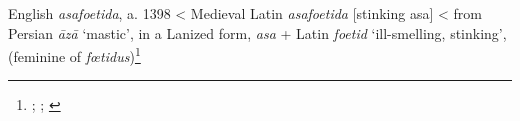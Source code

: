 \begin{etymology}\label{ety:asafoetida}
English \textit{asafoetida}, a. 1398
< Medieval Latin \textit{asafoetida} [stinking asa]
< from Persian \textit{āzā} `mastic', in a Lanized form, \textit{asa}
 + Latin \textit{foetid} `ill-smelling, stinking', (feminine of \textit{fœtidus})\footnote{\textcite[s.v. asafoetida]{oed}; \textcite[353]{laufer_sino-iranica_1919}; \textcite[42]{steingass_comprehensive_1892}}
\end{etymology}